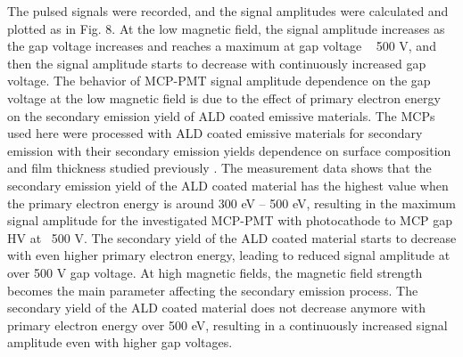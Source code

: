 ﻿\documentclass[preprint,5p]{elsarticle}
\begin{document}
The pulsed signals were recorded, and the signal amplitudes were calculated and 
plotted as in Fig. 8. At the low magnetic field, the signal amplitude increases 
as the gap voltage increases and reaches a maximum at gap voltage ~ 500 V, and 
then the signal amplitude starts to decrease with continuously increased gap 
voltage. The behavior of MCP-PMT signal amplitude dependence on the gap voltage 
at the low magnetic field is due to the effect of primary electron energy on 
the secondary emission yield of ALD coated emissive materials. The MCPs used here 
were processed with ALD coated emissive materials for secondary emission with their
secondary emission yields dependence on surface composition and film thickness
studied previously \cite{22}. The measurement data shows that 
the secondary emission yield of the ALD coated material has the highest value 
when the primary electron energy is around 300 eV – 500 eV, resulting in the 
maximum signal amplitude for the investigated MCP-PMT with photocathode to MCP 
gap HV at ~500 V. The secondary yield of the ALD coated material starts to 
decrease with even higher primary electron energy, leading to reduced signal 
amplitude at over 500 V gap voltage. At high magnetic fields, the magnetic 
field strength becomes the main parameter affecting the secondary emission 
process. The secondary yield of the ALD coated material does not decrease 
anymore with primary electron energy over 500 eV, resulting in a continuously 
increased signal amplitude even with higher gap voltages.
\end{document}
